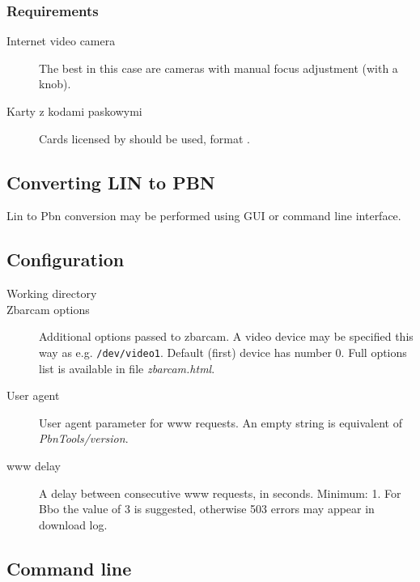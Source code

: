 \documentclass[polish,a4paper,11pt,oneside]{article}
\begin{document}
\subsubsection{Requirements}
\begin{description}
\item[Internet video camera]
  The best in this case are cameras with manual focus adjustment (with a knob).
  
\item[Karty z kodami paskowymi]
  Cards licensed by 
  should be used, format .
\end{description}

\subsection{Converting LIN to PBN}

Lin to Pbn conversion may be performed using GUI or command line
interface.


\subsection{Configuration} \label{konfig} %

\begin{description}
\item[Working directory]
\item[Zbarcam options]
  Additional options passed to zbarcam.
  A video device may be specified this way as e.g. \verb!/dev/video1!.
  Default (first) device has number 0.
  Full options list is available in file {\em zbarcam.html}.
\item[User agent]
  User agent parameter for www requests. An empty string is equivalent of
  {\em PbnTools/version}.
\item[www delay]
  A delay between consecutive www requests, in seconds.
  Minimum: 1. For Bbo the value of 3 is suggested,
  otherwise 503 errors may appear in download log.

\end{description}


\subsection{Command line} \label{commLine} %
\end{document}
